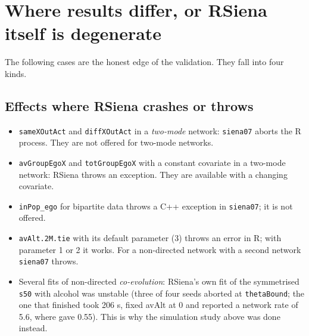 \section{Where results differ, or RSiena itself is degenerate}\label{sec:differences}
The following cases are the honest edge of the validation. They fall into four kinds.

\subsection{Effects where RSiena crashes or throws}
\begin{itemize}
\item \texttt{sameXOutAct} and \texttt{diffXOutAct} in a \emph{two-mode} network: \texttt{siena07} aborts the R process. They are not offered for two-mode networks.
\item \texttt{avGroupEgoX} and \texttt{totGroupEgoX} with a constant covariate in a two-mode network: RSiena throws an exception. They are available with a changing covariate.
\item \texttt{inPop\_ego} for bipartite data throws a C++ exception in \texttt{siena07}; it is not offered.
\item \texttt{avAlt.2M.tie} with its default parameter (3) throws an error in R; with parameter 1 or 2 it works. For a non-directed network with a second network \texttt{siena07} throws.
\item Several fits of non-directed \emph{co-evolution}: RSiena's own fit of the symmetrised \texttt{s50} with alcohol was unstable (three of four seeds aborted at \texttt{thetaBound}; the one that finished took 206 s, fixed avAlt at 0 and reported a network rate of 5.6, where \nwsaom{} gave 0.55). This is why the simulation study above was done instead.
\end{itemize}

